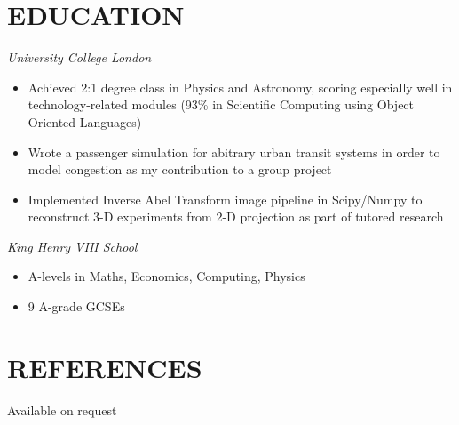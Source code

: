 \documentclass[margin, 10pt]{res} %
\begin{document}
\begin{resume}

\section{EDUCATION}

{\sl University College London} \\
\begin{itemize} \itemsep -2pt %
\item Achieved 2:1 degree class in Physics and Astronomy, scoring especially well in technology-related modules (93\% in Scientific Computing using Object Oriented Languages)
\item Wrote a passenger simulation for abitrary urban transit systems in order to model congestion as my contribution to a group project
\item Implemented Inverse Abel Transform image pipeline in Scipy/Numpy to reconstruct 3-D experiments from 2-D projection as part of tutored research
\end{itemize}

{\sl King Henry VIII School} \\
\begin{itemize} 
\item A-levels in Maths, Economics, Computing, Physics
\item 9 A-grade GCSEs
\end{itemize} 

\section{REFERENCES}
Available on request


\end{resume}
\end{document}
